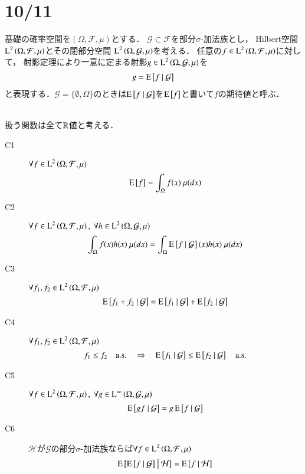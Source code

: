 \section{10/11}
	基礎の確率空間を$(\Omega,\mathcal{F},\mu)$とする．
	$\mathcal{G} \subset \mathcal{F}$を部分$\sigma$-加法族とし，
	Hilbert空間$\operatorname{L}^{2} \left(\Omega,\mathcal{F},\mu\right)$とその閉部分空間
	$\operatorname{L}^{2} \left(\Omega, \mathcal{G},\mu\right)$を考える．
	任意の$f \in \operatorname{L}^{2} \left(\Omega, \mathcal{F},\mu\right)$に対して，
	射影定理により一意に定まる射影$g \in \operatorname{L}^{2} \left(\Omega, \mathcal{G},\mu\right)$を
	\begin{align}
		g = \operatorname{E} \left[ f \ \middle|\ \mathcal{G} \right]
	\end{align}
	と表現する．$\mathcal{G} = \{\emptyset, \Omega\}$のときは$\operatorname{E} \left[ f \ \middle|\ \mathcal{G} \right]$を$\operatorname{E} \left[ f \right]$と書いて$f$の期待値と呼ぶ．
	\begin{qst}\mbox{}\\
		扱う関数は全て$\mathbb{R}$値と考える．
		\begin{description}
			\item[C1] $\forall f \in \operatorname{L}^{2} \left(\Omega, \mathcal{F},\mu\right)$
				\begin{align}
					\operatorname{E} \left[ f \right] = \int_{\Omega} f(x)\ \mu(dx)
				\end{align}
				
			\item[C2]	$\forall f \in \operatorname{L}^{2} \left(\Omega, \mathcal{F},\mu\right),\ \forall h \in \operatorname{L}^{2} \left(\Omega, \mathcal{G},\mu\right)$
				\begin{align}
					\int_{\Omega} f(x)h(x)\ \mu(dx) = \int_{\Omega} \operatorname{E} \left[ f \ \middle|\ \mathcal{G} \right](x)h(x)\ \mu(dx)
				\end{align}
				
			\item[C3]	$\forall f_1,f_2 \in \operatorname{L}^{2} \left(\Omega, \mathcal{F},\mu\right)$
				\begin{align}
					\operatorname{E} \left[ f_1 + f_2 \ \middle|\ \mathcal{G} \right] = \operatorname{E} \left[ f_1 \ \middle|\ \mathcal{G} \right] + \operatorname{E} \left[ f_2 \ \middle|\ \mathcal{G} \right]
				\end{align}

			\item[C4]	$\forall f_1,f_2 \in \operatorname{L}^{2} \left(\Omega, \mathcal{F},\mu\right)$
				\begin{align}
					f_1 \leq f_2 \quad \mathrm{a.s.} \quad \Rightarrow \quad \operatorname{E} \left[ f_1 \ \middle|\ \mathcal{G} \right] \leq \operatorname{E} \left[ f_2 \ \middle|\ \mathcal{G} \right] \quad \mathrm{a.s.}
				\end{align}
			
			\item[C5]	$\forall f \in \operatorname{L}^{2} \left(\Omega, \mathcal{F},\mu\right),\ \forall g \in \operatorname{L}^{\infty} \left(\Omega, \mathcal{G},\mu\right)$
				\begin{align}
					\operatorname{E} \left[ gf \ \middle|\ \mathcal{G} \right] = g\operatorname{E} \left[ f \ \middle|\ \mathcal{G} \right]
				\end{align}
			
			\item[C6]	$\mathcal{H}$が$\mathcal{G}$の部分$\sigma$-加法族ならば$\forall f \in \operatorname{L}^{2} \left(\Omega, \mathcal{F},\mu\right)$
				\begin{align}
					\operatorname{E} \left[ \operatorname{E} \left[ f \ \middle|\ \mathcal{G} \right] \ \middle|\ \mathcal{H} \right] = \operatorname{E} \left[ f \ \middle|\ \mathcal{H} \right]
				\end{align}
		\end{description}
	\end{qst}
	
